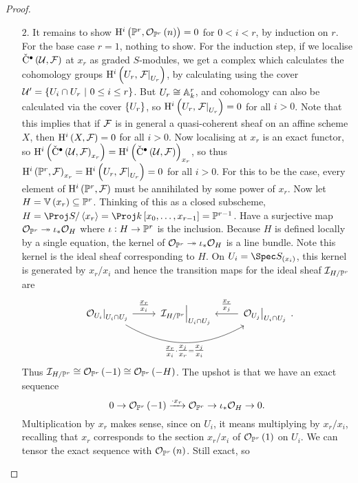 \begin{proof}
\begin{itemize}
\item[$ 2 $.] It remains to show $ \H^i\br{\PP^r, \OOO_{\PP^r}\br{n}} = 0 $ for $ 0 < i < r $, by induction on $ r $. For the base case $ r = 1 $, nothing to show. For the induction step, if we localise $ \vC^\bullet\br{\UUU, \FFF} $ at $ x_r $ as graded $ S $-modules, we get a \Cech complex which calculates the cohomology groups $ \H^i\br{U_r, \eval{\FFF}_{U_r}} $, by calculating using the \Cech cover $ \UUU' = \cbr{U_i \cap U_r \st 0 \le i \le r} $. But $ U_r \cong \AA_k^r $, and \Cech cohomology can also be calculated via the cover $ \cbr{U_r} $, so $ \H^i\br{U_r, \eval{\FFF}_{U_r}} = 0 $ for all $ i > 0 $. Note that this implies that if $ \FFF $ is in general a quasi-coherent sheaf on an affine scheme $ X $, then $ \H^i\br{X, \FFF} = 0 $ for all $ i > 0 $. Now localising at $ x_r $ is an exact functor, so $ \H^i\br{\vC^\bullet\br{\UUU, \FFF}_{x_r}} = \H^i\br{\vC^\bullet\br{\UUU, \FFF}}_{x_r} $, so thus $ \H^i\br{\PP^r, \FFF}_{x_r} = \H^i\br{U_r, \eval{\FFF}_{U_r}} = 0 $ for all $ i > 0 $. For this to be the case, every element of $ \H^i\br{\PP^r, \FFF} $ must be annihilated by some power of $ x_r $. Now let $ H = \VV\br{x_r} \subseteq \PP^r $. Thinking of this as a closed subscheme, $ H = \Proj S / \abr{x_r} = \Proj k\sbr{x_0, \dots, x_{r - 1}} = \PP^{r - 1} $. Have a surjective map $ \OOO_{\PP^r} \twoheadrightarrow \iota_*\OOO_H $ where $ \iota : H \to \PP^r $ is the inclusion. Because $ H $ is defined locally by a single equation, the kernel of $ \OOO_{\PP^r} \twoheadrightarrow \iota_*\OOO_H $ is a line bundle. Note this kernel is the ideal sheaf corresponding to $ H $. On $ U_i = \Spec S_{\br{x_i}} $, this kernel is generated by $ x_r / x_i $ and hence the transition maps for the ideal sheaf $ \III_{H / \PP^r} $ are
$$
\begin{tikzcd}
\eval{\OOO_{U_i}}_{U_i \cap U_j} \arrow{r}{\tfrac{x_r}{x_i}} \arrow[bend right=30]{rr}[swap]{\tfrac{x_r}{x_i} \cdot \tfrac{x_j}{x_r} = \tfrac{x_j}{x_i}} & \eval{\III_{H / \PP^r}}_{U_i \cap U_j} & \eval{\OOO_{U_j}}_{U_i \cap U_j} \arrow{l}[swap]{\tfrac{x_r}{x_j}}
\end{tikzcd}.
$$
Thus $ \III_{H / \PP^r} \cong \OOO_{\PP^r}\br{-1} \cong \OOO_{\PP^r}\br{-H} $. The upshot is that we have an exact sequence
$$ 0 \to \OOO_{\PP^r}\br{-1} \xrightarrow{\cdot x_r} \OOO_{\PP^r} \to \iota_*\OOO_H \to 0. $$
Multiplication by $ x_r $ makes sense, since on $ U_i $, it means multiplying by $ x_r / x_i $, recalling that $ x_r $ corresponds to the section $ x_r / x_i $ of $ \OOO_{\PP^r}\br{1} $ on $ U_i $. We can tensor the exact sequence with $ \OOO_{\PP^r}\br{n} $. Still exact, so

\end{itemize}
\end{proof}
